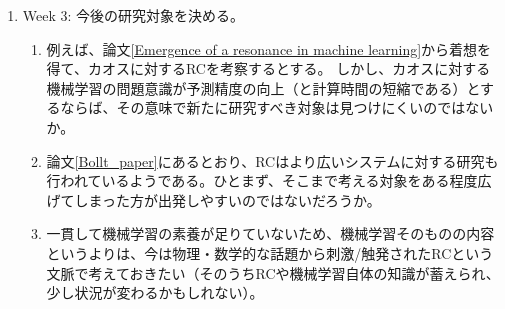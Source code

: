 \begin{enumerate}
\begin{enumerate}
  \end{enumerate}
  \item Week 3: 今後の研究対象を決める。\begin{enumerate}
    \item 例えば、論文\ref{Emergence of a resonance in machine learning}から着想を得て、カオスに対するRCを考察するとする。
    しかし、カオスに対する機械学習の問題意識が予測精度の向上（と計算時間の短縮である）とするならば、その意味で新たに研究すべき対象は見つけにくいのではないか。
    \item 論文\ref{Bollt_paper}にあるとおり、RCはより広いシステムに対する研究も行われているようである。ひとまず、そこまで考える対象をある程度広げてしまった方が出発しやすいのではないだろうか。
    \item 一貫して機械学習の素養が足りていないため、機械学習そのものの内容というよりは、今は物理・数学的な話題から刺激/触発されたRCという文脈で考えておきたい（そのうちRCや機械学習自体の知識が蓄えられ、少し状況が変わるかもしれない）。
  \end{enumerate}
\end{enumerate}